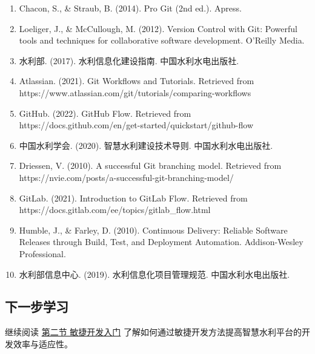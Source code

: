 \begin{enumerate}
\def\labelenumi{\arabic{enumi}.}
\tightlist
\item
  Chacon, S., \& Straub, B. (2014). Pro Git (2nd ed.). Apress.
\item
  Loeliger, J., \& McCullough, M. (2012). Version Control with Git:
  Powerful tools and techniques for collaborative software development.
  O'Reilly Media.
\item
  水利部. (2017). 水利信息化建设指南. 中国水利水电出版社.
\item
  Atlassian. (2021). Git Workflows and Tutorials. Retrieved from
  https://www.atlassian.com/git/tutorials/comparing-workflows
\item
  GitHub. (2022). GitHub Flow. Retrieved from
  https://docs.github.com/en/get-started/quickstart/github-flow
\item
  中国水利学会. (2020). 智慧水利建设技术导则. 中国水利水电出版社.
\item
  Driessen, V. (2010). A successful Git branching model. Retrieved from
  https://nvie.com/posts/a-successful-git-branching-model/
\item
  GitLab. (2021). Introduction to GitLab Flow. Retrieved from
  https://docs.gitlab.com/ee/topics/gitlab\_flow.html
\item
  Humble, J., \& Farley, D. (2010). Continuous Delivery: Reliable
  Software Releases through Build, Test, and Deployment Automation.
  Addison-Wesley Professional.
\item
  水利部信息中心. (2019). 水利信息化项目管理规范. 中国水利水电出版社.
\end{enumerate}

\subsection{下一步学习}\label{ux4e0bux4e00ux6b65ux5b66ux4e60}

继续阅读 \href{section03-02.md}{第二节 敏捷开发入门}
了解如何通过敏捷开发方法提高智慧水利平台的开发效率与适应性。
